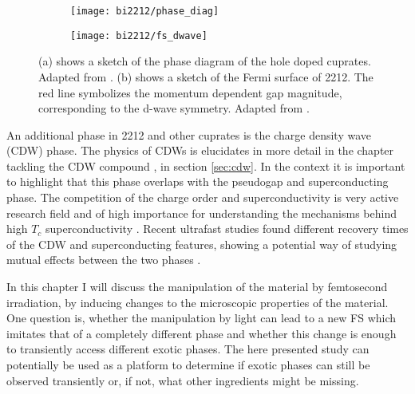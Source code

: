 \begin{figure}[t]
	\centering
	\begin{subfigure}[b]{0.49\textwidth}
		\texttt{[image: bi2212/phase\_diag]}
		\caption{}
	\end{subfigure}
	\begin{subfigure}[b]{0.45\textwidth}
		\texttt{[image: bi2212/fs\_dwave]}
		\caption{}
	\end{subfigure}
	\caption{(a) shows a sketch of the phase diagram of the hole doped cuprates. Adapted from \cite{keimer_quantum_2015}. (b) shows a sketch of the Fermi surface of 2212. The red line symbolizes the momentum dependent gap magnitude, corresponding to the d-wave symmetry. Adapted from \cite{zhang_photoinduced_2017}.}
	\label{fig:phase_diag}
\end{figure}

An additional phase in 2212 and other cuprates is the charge density wave (CDW) phase.
The physics of CDWs is elucidates in more detail in the chapter tackling the CDW compound , in section \ref{sec:cdw}.
In the context it is important to highlight that this phase overlaps with the pseudogap and superconducting phase.
The competition of the charge order and superconductivity is very active research field and of high importance for understanding the mechanisms behind high $T_c$ superconductivity \cite{arpaia_charge_2021}.
Recent ultrafast studies found different recovery times of the CDW and superconducting features, showing a potential way of studying mutual effects between the two phases \cite{wandel_enhanced_2022}.

In this chapter I will discuss the manipulation of the material by femtosecond irradiation, by inducing changes to the microscopic properties of the material.
One question is, whether the manipulation by light can lead to a new FS which imitates that of a completely different phase and whether this change is enough to transiently access different exotic phases.
The here presented study can potentially be used as a platform to determine if exotic phases can still be observed transiently or, if not, what other ingredients might be missing.

